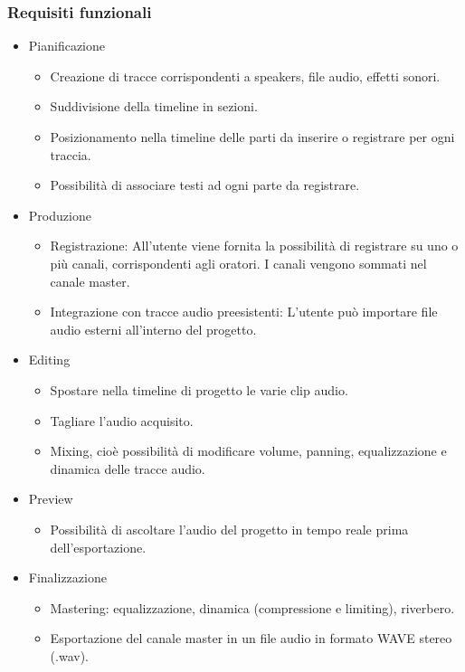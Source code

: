 \documentclass[a4paper,12pt]{report}
\begin{document}
\subsubsection{Requisiti funzionali}
\begin{itemize}
	\item Pianificazione
	\begin{itemize}
	    \item Creazione di tracce corrispondenti a speakers, file audio, effetti sonori. 
	    \item Suddivisione della timeline in sezioni.
        \item Posizionamento nella timeline delle parti da inserire o registrare per ogni traccia.
        \item Possibilità di associare testi ad ogni parte da registrare.
	\end{itemize}
	\item Produzione
	\begin{itemize}
	    \item Registrazione: All’utente viene fornita la possibilità di registrare su uno o più canali, corrispondenti agli oratori. I canali vengono sommati nel canale master.
	    \item Integrazione con tracce audio preesistenti: L’utente può importare file audio esterni all’interno del progetto.
	\end{itemize}
	\item Editing
	\begin{itemize}
	    \item Spostare nella timeline di progetto le varie clip audio.
        \item Tagliare l’audio acquisito. 
        \item Mixing, cioè possibilità di modificare volume, panning, equalizzazione e dinamica delle tracce audio.
	\end{itemize}
	\item Preview
	\begin{itemize}
	    \item Possibilità di ascoltare l’audio del progetto in tempo reale prima dell’esportazione.
	\end{itemize}
	\item Finalizzazione
	\begin{itemize}
	    \item Mastering: equalizzazione, dinamica (compressione e limiting), riverbero.
	    \item Esportazione del canale master in un file audio in formato WAVE stereo (.wav).

\end{itemize}
\end{itemize}
\end{document}
